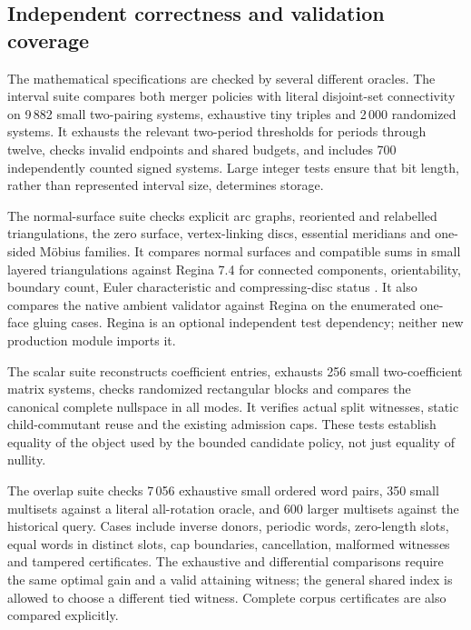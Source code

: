 \subsection{Independent correctness and validation coverage}

The mathematical specifications are checked by several different oracles.
The interval suite compares both merger policies with literal disjoint-set
connectivity on 9\,882 small two-pairing systems, exhaustive tiny triples
and 2\,000 randomized systems. It exhausts the relevant two-period
thresholds for periods through twelve, checks invalid endpoints and
shared budgets, and includes 700 independently counted signed systems.
Large integer tests ensure that bit length, rather than represented
interval size, determines storage.

The normal-surface suite checks explicit arc graphs, reoriented and
relabelled triangulations, the zero surface, vertex-linking discs,
essential meridians and one-sided M\"obius families. It compares normal
surfaces and compatible sums in small layered triangulations against
Regina 7.4 for connected components, orientability, boundary count, Euler
characteristic and compressing-disc status \cite{regina}. It also compares
the native ambient validator against Regina on the enumerated one-face
gluing cases. Regina is an optional independent test dependency; neither
new production module imports it.

The scalar suite reconstructs coefficient entries, exhausts 256 small
two-coefficient matrix systems, checks randomized rectangular blocks and
compares the canonical complete nullspace in all modes. It verifies
actual split witnesses, static child-commutant reuse and the existing
admission caps. These tests establish equality of the object used by the
bounded candidate policy, not just equality of nullity.

The overlap suite checks 7\,056 exhaustive small ordered word pairs,
350 small multisets against a literal all-rotation oracle, and 600 larger
multisets against the historical query. Cases include inverse donors,
periodic words, zero-length slots, equal words in distinct slots, cap
boundaries, cancellation, malformed witnesses and tampered certificates.
The exhaustive and differential comparisons require the same optimal
gain and a valid attaining witness; the general shared index is allowed
to choose a different tied witness. Complete corpus certificates are
also compared explicitly.


